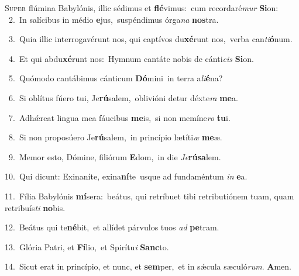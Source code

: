\lettrine{\initial\textcolor{\initialcolor}{S}}{uper} flúmina Babylónis, illic sédimus et \textbf{flé}\-vimus:~\star cum recordaré\textit{mur} \textbf{Si}\-on:\\
{\numbfont\textcolor{\numbcolor}{~2.}}~In salícibus in médio \textbf{e}\-jus,~\star suspéndimus órga\textit{na} \textbf{nos}\-tra.\par
{\numbfont\textcolor{\numbcolor}{~3.}}~Quia illic interrogavérunt nos, qui captívos du\-\textbf{xé}\-runt nos,~\star verba can\-\textit{ti}\-\textbf{ó}num.\par
{\numbfont\textcolor{\numbcolor}{~4.}}~Et qui abdu\-\textbf{xé}\-runt nos:~\star Hymnum cantáte nobis de cánti\textit{cis} \textbf{Si}\-on.\par
{\numbfont\textcolor{\numbcolor}{~5.}}~Quómodo cantábimus cánticum \textbf{Dó}\-mini~\star in terra a\-\textit{li}\-\textbf{é}na?\par
{\numbfont\textcolor{\numbcolor}{~6.}}~Si oblítus fúero tui, Je\-\textbf{rú}\-salem,~\star oblivióni detur déxte\textit{ra} \textbf{me}\-a.\par
{\numbfont\textcolor{\numbcolor}{~7.}}~Adhǽreat lingua mea fáucibus \textbf{me}\-is,~\star si non memíne\textit{ro} \textbf{tu}\-i.\par
{\numbfont\textcolor{\numbcolor}{~8.}}~Si non proposúero Je\-\textbf{rú}\-salem,~\star in princípio lætíti\textit{æ} \textbf{me}\-æ.\par
{\numbfont\textcolor{\numbcolor}{~9.}}~Memor esto, Dómine, filiórum \textbf{E}\-dom,~\star in die \textit{Je}\-\textbf{rú}\textbf{sa}lem.\par
{\numbfont\textcolor{\numbcolor}{10.}}~Qui dicunt: Exinaníte, exina\-\textbf{ní}\-te~\star usque ad fundaméntum \textit{in} \textbf{e}\-a.\par
{\numbfont\textcolor{\numbcolor}{11.}}~Fília Babylónis \textbf{mí}\-sera:~\star beátus, qui retríbuet tibi retributiónem tuam, quam retribuís\textit{ti} \textbf{no}\-bis.\par
{\numbfont\textcolor{\numbcolor}{12.}}~Beátus qui te\-\textbf{né}\-bit,~\star et allídet párvulos tuos \textit{ad} \textbf{pe}\-tram.\par
{\numbfont\textcolor{\numbcolor}{13.}}~Glória Patri, et \textbf{Fí}\-lio,~\star et Spirítu\textit{i} \textbf{Sanc}\-to.\par
{\numbfont\textcolor{\numbcolor}{14.}}~Sicut erat in princípio, et nunc, et \textbf{sem}\-per,~\star et in sǽcula sæculó\-\textit{rum}\-. \textbf{A}\-men.\par
